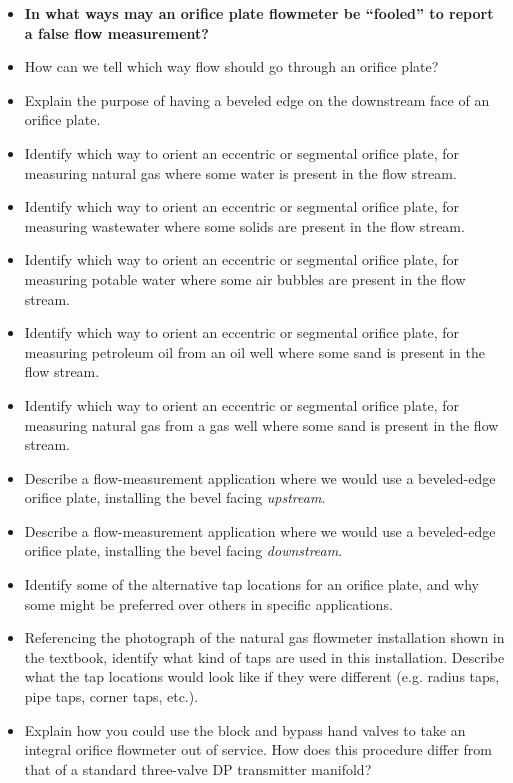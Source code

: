 \begin{itemize}
\item{} {\bf In what ways may an orifice plate flowmeter be ``fooled'' to report a false flow measurement?}
\item{} How can we tell which way flow should go through an orifice plate?
\item{} Explain the purpose of having a beveled edge on the downstream face of an orifice plate.
\item{} Identify which way to orient an eccentric or segmental orifice plate, for measuring natural gas where some water is present in the flow stream.
\item{} Identify which way to orient an eccentric or segmental orifice plate, for measuring wastewater where some solids are present in the flow stream.
\item{} Identify which way to orient an eccentric or segmental orifice plate, for measuring potable water where some air bubbles are present in the flow stream.
\item{} Identify which way to orient an eccentric or segmental orifice plate, for measuring petroleum oil from an oil well where some sand is present in the flow stream.
\item{} Identify which way to orient an eccentric or segmental orifice plate, for measuring natural gas from a gas well where some sand is present in the flow stream.
\item{} Describe a flow-measurement application where we would use a beveled-edge orifice plate, installing the bevel facing {\it upstream}.
\item{} Describe a flow-measurement application where we would use a beveled-edge orifice plate, installing the bevel facing {\it downstream}.
\item{} Identify some of the alternative tap locations for an orifice plate, and why some might be preferred over others in specific applications.
\item{} Referencing the photograph of the natural gas flowmeter installation shown in the textbook, identify what kind of taps are used in this installation.  Describe what the tap locations would look like if they were different (e.g. radius taps, pipe taps, corner taps, etc.).
\item{} Explain how you could use the block and bypass hand valves to take an integral orifice flowmeter out of service.  How does this procedure differ from that of a standard three-valve DP transmitter manifold?
\end{itemize}





